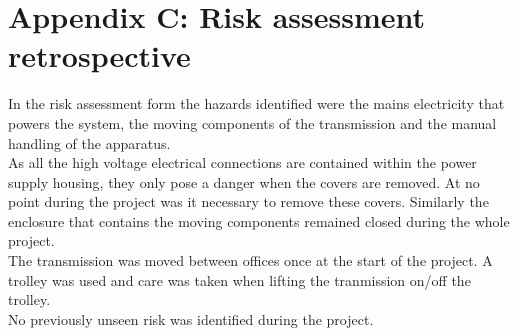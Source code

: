 \documentclass[12pt]{article}
\begin{document}
\section*{Appendix C: Risk assessment retrospective}
%
In the risk assessment form the hazards identified were the mains electricity that powers the system, the moving components of the transmission and the manual handling of the apparatus.\\
As all the high voltage electrical connections are contained within the power supply housing, they only pose a danger when the covers are removed. At no point during the project was it necessary to remove these covers. Similarly the enclosure that contains the moving components remained closed during the whole project. \\
The transmission was moved between offices once at the start of the project. A trolley was used and care was taken when lifting the tranmission on/off the trolley. \\
No previously unseen risk was identified during the project.  
\end{document}
